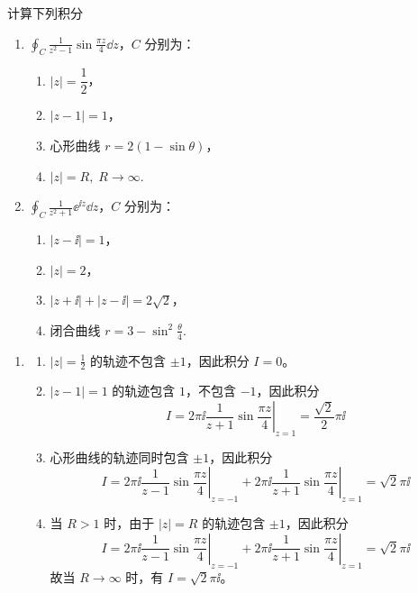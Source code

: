 
\begin{question}
计算下列积分
\begin{enumerate}
  \item \(\displaystyle \oint_{C} \frac{1}{z^2-1} \sin \frac{\pi z}{4} \dd{z}\)，\(C\) 分别为：

\begin{enumerate}
  \item \(|z|=\dfrac12\)，
  \item \(|z-1|=1\)，
  \item 心形曲线 \(r=2(1-\sin\theta)\)，
  \item \(|z|=R,\;R\to\infty\).

\end{enumerate}
  \item \(\displaystyle \oint_{C} \frac{1}{z^2+1} \ee^{\ii z} \dd{z}\)，\(C\) 分别为：

\begin{enumerate}
  \item \(|z-\ii|=1\)，
  \item \(|z|=2\)，
  \item \(|z+\ii|+|z-\ii|=2\sqrt{2}\)，
  \item 闭合曲线 \(r=3-\sin^2\frac{\theta}{4}\).
\end{enumerate}
\end{enumerate}

\begin{solution}
\begin{enumerate}
  \item
\begin{enumerate}
  \item \(|z|=\frac12\) 的轨迹不包含 \(\pm1\)，因此积分 \(I=0\)。

  \item \(|z-1|=1\) 的轨迹包含 \(1\)，不包含 \(-1\)，因此积分
\[ I=2\pi\ii \left.\frac{1}{z+1}\sin\frac{\pi z}{4}\right|_{z=1}=\frac{\sqrt{2}}{2}\pi\ii \]

  \item 心形曲线的轨迹同时包含 \(\pm1\)，因此积分
\[ I=2\pi\ii \left.\frac{1}{z-1}\sin\frac{\pi z}{4}\right|_{z=-1}+2\pi\ii \left.\frac{1}{z+1}\sin\frac{\pi z}{4}\right|_{z=1}= \sqrt{2}\pi\ii \]

  \item 当 \(R>1\) 时，由于 \(|z|=R\) 的轨迹包含 \(\pm1\)，因此积分
\[ I=2\pi\ii \left.\frac{1}{z-1}\sin\frac{\pi z}{4}\right|_{z=-1}+2\pi\ii \left.\frac{1}{z+1}\sin\frac{\pi z}{4}\right|_{z=1}= \sqrt{2}\pi\ii \]
故当 \(R\to\infty\) 时，有 \(I=\sqrt{2}\pi\ii\)。


\end{enumerate}
\end{enumerate}
\end{solution}
\end{question}
